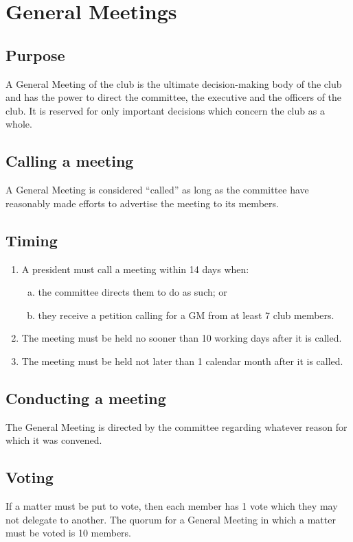 \documentclass{constitution}
\begin{document}
\section{General Meetings}\label{generalMeetings}
\subsection{Purpose}
A General Meeting of the club is the ultimate decision-making body of the club and has the power to direct the committee, the executive and the officers of the club. It is reserved for only important decisions which concern the club as a whole.

\subsection{Calling a meeting}
A General Meeting is considered ``called'' as long as the committee have reasonably made efforts to advertise the meeting to its members.

\subsection{Timing}
\begin{enumerate}[(1)]
    \item A president must call a meeting within 14 days when:
          \begin{enumerate}[(a)]
              \item the committee directs them to do as such; or
              \item they receive a petition calling for a GM from at least 7 club members.
          \end{enumerate}
    \item The meeting must be held no sooner than 10 working days after it is called.
    \item The meeting must be held not later than 1 calendar month after it is called.
\end{enumerate}

\subsection{Conducting a meeting}
The General Meeting is directed by the committee regarding whatever reason for which it was convened.

\subsection{Voting}
If a matter must be put to vote, then each member has 1 vote which they may not delegate to another. The quorum for a General Meeting in which a matter must be voted is 10 members.
\end{document}
